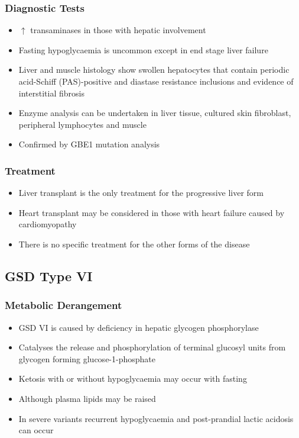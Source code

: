 \documentclass{scrartcl}
\begin{document}
\subsubsection{Diagnostic Tests}
\label{sec:org54c31aa}

\begin{itemize}
\item \(\uparrow\) transaminases in those with hepatic involvement
\item Fasting hypoglycaemia is uncommon except in end stage liver failure
\item Liver and muscle histology show swollen hepatocytes that contain
periodic acid-Schiff (PAS)-positive and diastase resistance
inclusions and evidence of interstitial fibrosis
\item Enzyme analysis can be undertaken in liver tissue, cultured skin
fibroblast, peripheral lymphocytes and muscle
\item Confirmed by GBE1 mutation analysis
\end{itemize}

\subsubsection{Treatment}
\label{sec:org24272be}
\begin{itemize}
\item Liver transplant is the only treatment for the progressive liver form
\item Heart transplant may be considered in those with heart failure caused by cardiomyopathy
\item There is no specific treatment for the other forms of the disease
\end{itemize}
\subsection{GSD Type VI}
\label{sec:org1391c27}
\subsubsection{Metabolic Derangement}
\label{sec:org908c2d6}
\begin{itemize}
\item GSD VI is caused by deficiency in hepatic glycogen phosphorylase
\item Catalyses the release and phosphorylation of terminal glucosyl units
from glycogen forming glucose-1-phosphate
\item Ketosis with or without hypoglycaemia may occur with fasting
\item Although plasma lipids may be raised
\item In severe variants recurrent hypoglycaemia and post-prandial lactic
acidosis can occur
\end{itemize}
\end{document}
